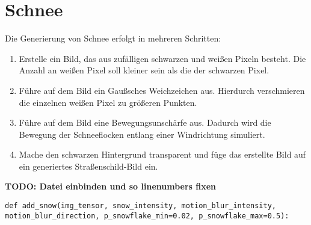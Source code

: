 \section{Schnee}
Die Generierung von Schnee erfolgt in mehreren Schritten:
\begin{enumerate}
  \item Erstelle ein Bild, das aus zufälligen schwarzen und weißen Pixeln besteht. Die Anzahl an weißen Pixel soll kleiner sein als die der schwarzen Pixel.
  \item Führe auf dem Bild ein Gaußsches Weichzeichen aus. Hierdurch verschmieren die einzelnen weißen Pixel zu größeren Punkten.
  \item Führe auf dem Bild eine Bewegungsunschärfe aus. Dadurch wird die Bewegung der Schneeflocken entlang einer Windrichtung simuliert.
  \item Mache den schwarzen Hintergrund transparent und füge das erstellte Bild auf ein generiertes Straßenschild-Bild ein.
\end{enumerate}

\textbf{TODO: Datei einbinden und so linenumbers fixen}
\begin{code}
\label{code:snow-delcaration}
\begin{verbatim}
def add_snow(img_tensor, snow_intensity, motion_blur_intensity, motion_blur_direction, p_snowflake_min=0.02, p_snowflake_max=0.5):
\end{verbatim}
\end{code}

